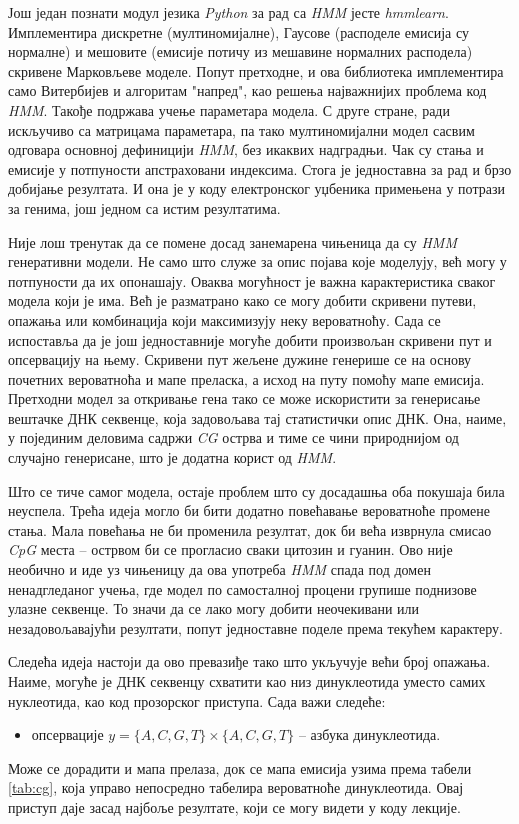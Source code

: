 \documentclass[12pt,oneside]{memoir}
\begin{document}
\begin{CJK}{UTF8}{ipxm}
Још један познати модул језика \textit{Python} за рад са \textit{HMM} јесте \textit{hmmlearn}\cite{lee2021}. Имплементира дискретне (мултиномијалне), Гаусове (расподеле емисија су нормалне) и мешовите (емисије потичу из мешавине нормалних расподела) скривене Марковљеве моделе. Попут претходне, и ова библиотека имплементира само Витербијев и алгоритам "напред", као решења најважнијих проблема код \textit{HMM}. Такође подржава учење параметара модела. С друге стране, ради искључиво са матрицама параметара, па тако мултиномијални модел сасвим одговара основној дефиницији \textit{HMM}, без икаквих надградњи. Чак су стања и емисије у потпуности апстраховани индексима. Стога је једноставна за рад и брзо добијање резултата. И она је у коду електронског уџбеника примењена у потрази за генима, још једном са истим резултатима.

Није лош тренутак да се помене досад занемарена чињеница да су \textit{HMM} генеративни модели. Не само што служе за опис појава које моделују, већ могу у потпуности да их опонашају. Оваква могућност је важна карактеристика сваког модела који је има. Већ је разматрано како се могу добити скривени путеви, опажања или комбинација који максимизују неку вероватноћу. Сада се испоставља да је још једноставније могуће добити произвољан скривени пут и опсервацију на њему. Скривени пут жељене дужине генерише се на основу почетних вероватноћа и мапе преласка, а исход на путу помоћу мапе емисија. Претходни модел за откривање гена тако се може искористити за генерисање вештачке ДНК секвенце, која задовољава тај статистички опис ДНК. Она, наиме, у појединим деловима садржи \textit{CG} острва и тиме се чини природнијом од случајно генерисане, што је додатна корист од \textit{HMM}.

Што се тиче самог модела, остаје проблем што су досадашња оба покушаја била неуспела. Трећа идеја могло би бити додатно повећавање вероватноће промене стања. Мала повећања не би променила резултат, док би већа изврнула смисао \textit{CpG} места -- острвом би се прогласио сваки цитозин и гуанин. Ово није необично и иде уз чињеницу да ова употреба \textit{HMM} спада под домен ненадгледаног учења, где модел по самосталној процени групише поднизове улазне секвенце. То значи да се лако могу добити неочекивани или незадовољавајући резултати, попут једноставне поделе према текућем карактеру.

Следећа идеја настоји да ово превазиђе тако што укључује већи број опажања. Наиме, могуће је ДНК секвенцу схватити као низ динуклеотида уместо самих нуклеотида, као код прозорског приступа. Сада важи следеће:
\begin{itemize}
  \item опсервације $y = \{A, C, G, T\} \times \{A, C, G, T\}$ -- азбука динуклеотида.
\end{itemize}
Може се дорадити и мапа прелаза, док се мапа емисија узима према табели \ref{tab:cg}, која управо непосредно табелира вероватноће динуклеотида. Овај приступ даје засад најбоље резултате, који се могу видети у коду лекције.


\end{CJK}
\end{document}
